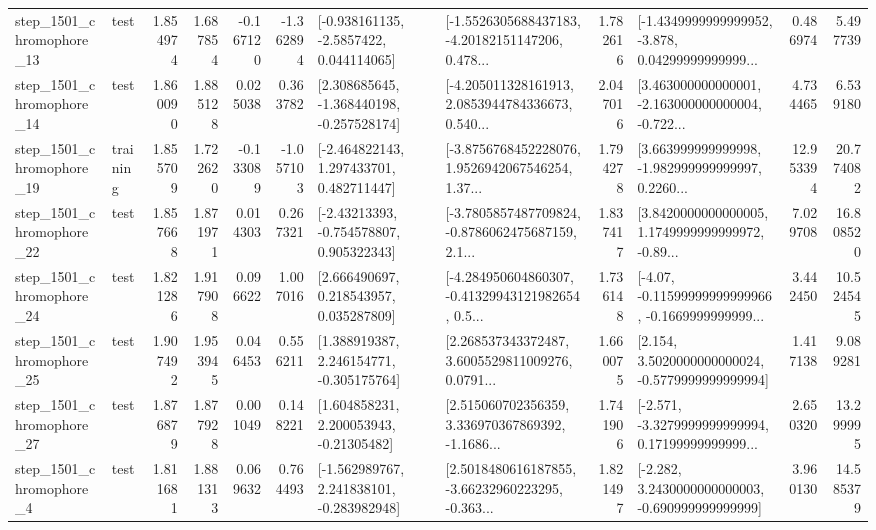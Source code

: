\begin{tabular}{llrrrrllrlrr}
 step\_1501\_chromophore\_13 &      test &      1.854974 &    1.687854 &     -0.167120 & -1.362894 &     [-0.938161135, -2.5857422, 0.044114065] &  [-1.5526305688437183, -4.20182151147206, 0.478... &       1.782616 &  [-1.4349999999999952, -3.878, 0.04299999999999... &            0.486974 &          5.497739 \\
 step\_1501\_chromophore\_14 &      test &      1.860090 &    1.885128 &      0.025038 &  0.363782 &   [2.308685645, -1.368440198, -0.257528174] &  [-4.205011328161913, 2.0853944784336673, 0.540... &       2.047016 &  [3.463000000000001, -2.163000000000004, -0.722... &            4.734465 &          6.539180 \\
 step\_1501\_chromophore\_19 &  training &      1.855709 &    1.722620 &     -0.133089 & -1.057103 &    [-2.464822143, 1.297433701, 0.482711447] &  [-3.8756768452228076, 1.9526942067546254, 1.37... &       1.794278 &  [3.663999999999998, -1.982999999999997, 0.2260... &           12.953394 &         20.774082 \\
 step\_1501\_chromophore\_22 &      test &      1.857668 &    1.871971 &      0.014303 &  0.267321 &    [-2.43213393, -0.754578807, 0.905322343] &  [-3.7805857487709824, -0.8786062475687159, 2.1... &       1.837417 &  [3.8420000000000005, 1.1749999999999972, -0.89... &            7.029708 &         16.808520 \\
 step\_1501\_chromophore\_24 &      test &      1.821286 &    1.917908 &      0.096622 &  1.007016 &     [2.666490697, 0.218543957, 0.035287809] &  [-4.284950604860307, -0.41329943121982654, 0.5... &       1.736148 &  [-4.07, -0.11599999999999966, -0.1669999999999... &            3.442450 &         10.524545 \\
 step\_1501\_chromophore\_25 &      test &      1.907492 &    1.953945 &      0.046453 &  0.556211 &    [1.388919387, 2.246154771, -0.305175764] &  [2.268537343372487, 3.6005529811009276, 0.0791... &       1.660075 &   [2.154, 3.5020000000000024, -0.5779999999999994] &            1.417138 &          9.089281 \\
 step\_1501\_chromophore\_27 &      test &      1.876879 &    1.877928 &      0.001049 &  0.148221 &     [1.604858231, 2.200053943, -0.21305482] &  [2.515060702356359, 3.336970367869392, -1.1686... &       1.741906 &  [-2.571, -3.3279999999999994, 0.17199999999999... &            2.650320 &         13.299995 \\
  step\_1501\_chromophore\_4 &      test &      1.811681 &    1.881313 &      0.069632 &  0.764493 &   [-1.562989767, 2.241838101, -0.283982948] &  [2.5018480616187855, -3.66232960223295, -0.363... &       1.821497 &   [-2.282, 3.2430000000000003, -0.690999999999999] &            3.960130 &         14.585379 \\

\end{tabular}
